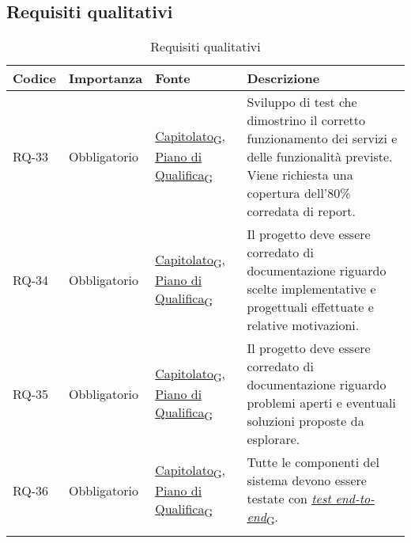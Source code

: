 \subsection{Requisiti qualitativi}
\begin{longtable}{|>{\centering\arraybackslash}m{}|>{\centering\arraybackslash}m{}|>{\centering\arraybackslash}m{}|>{\centering\arraybackslash}m{}|}
	\hline
	\textbf{Codice} & \textbf{Importanza} & \textbf{Fonte}                                                                                                                                                                                                                                       & \textbf{Descrizione}                                                                                                                                                                            \\\hline
	\endfirsthead
	RQ-33           & Obbligatorio        & \href{https://7last.github.io/docs/rtb/documentazione-interna/glossario\#capitolato}{Capitolato\textsubscript{G}}, \href{https://7last.github.io/docs/rtb/documentazione-interna/glossario\#piano-di-qualifica}{Piano di Qualifica\textsubscript{G}} & Sviluppo di test che dimostrino il corretto funzionamento dei servizi e delle funzionalità previste. Viene richiesta una copertura dell'80\% corredata di report.                               \\\hline
	RQ-34           & Obbligatorio        & \href{https://7last.github.io/docs/rtb/documentazione-interna/glossario\#capitolato}{Capitolato\textsubscript{G}}, \href{https://7last.github.io/docs/rtb/documentazione-interna/glossario\#piano-di-qualifica}{Piano di Qualifica\textsubscript{G}} & Il progetto deve essere corredato di documentazione riguardo scelte implementative e progettuali effettuate e relative motivazioni.                                                             \\\hline
	RQ-35           & Obbligatorio        & \href{https://7last.github.io/docs/rtb/documentazione-interna/glossario\#capitolato}{Capitolato\textsubscript{G}}, \href{https://7last.github.io/docs/rtb/documentazione-interna/glossario\#piano-di-qualifica}{Piano di Qualifica\textsubscript{G}} & Il progetto deve essere corredato di documentazione riguardo problemi aperti e eventuali soluzioni proposte da esplorare.                                                                       \\\hline
	RQ-36           & Obbligatorio        & \href{https://7last.github.io/docs/rtb/documentazione-interna/glossario\#capitolato}{Capitolato\textsubscript{G}}, \href{https://7last.github.io/docs/rtb/documentazione-interna/glossario\#piano-di-qualifica}{Piano di Qualifica\textsubscript{G}} & Tutte le componenti del sistema devono essere testate con \href{https://7last.github.io/docs/rtb/documentazione-interna/glossario\#test-end-to-end}{\textit{test end-to-end}\textsubscript{G}}. \\\hline
	\caption{Requisiti qualitativi}
	\label{table:2}
\end{longtable}

